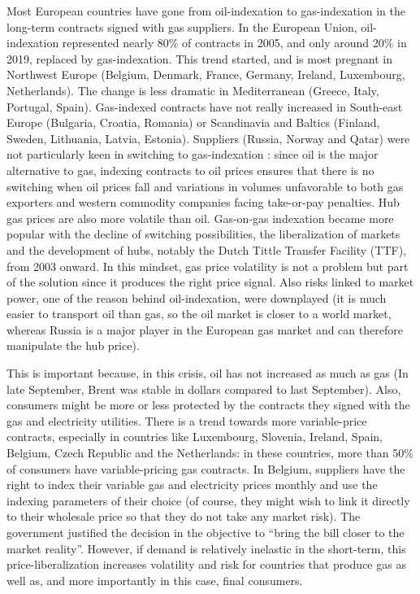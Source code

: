 \documentclass[
  9pt,
  a4paper,
  numbers=noendperiod,
  DIV=12]{scrartcl}
\begin{document}
Most European countries have gone from oil-indexation to gas-indexation
in the long-term contracts signed with gas suppliers. In the European
Union, oil-indexation represented nearly 80\% of contracts in 2005, and
only around 20\% in 2019, replaced by gas-indexation. This trend
started, and is most pregnant in Northwest Europe (Belgium, Denmark,
France, Germany, Ireland, Luxembourg, Netherlands). The change is less
dramatic in Mediterranean (Greece, Italy, Portugal, Spain). Gas-indexed
contracts have not really increased in South-east Europe (Bulgaria,
Croatia, Romania) or Scandinavia and Baltics (Finland, Sweden,
Lithuania, Latvia, Estonia). Suppliers (Russia, Norway and Qatar) were
not particularly keen in switching to gas-indexation : since oil is the
major alternative to gas, indexing contracts to oil prices ensures that
there is no switching when oil prices fall and variations in volumes
unfavorable to both gas exporters and western commodity companies facing
take-or-pay penalties. Hub gas prices are also more volatile than oil.
Gas-on-gas indexation became more popular with the decline of switching
possibilities, the liberalization of markets and the development of
hubs, notably the Dutch Tittle Transfer Facility (TTF), from 2003
onward. In this mindset, gas price volatility is not a problem but part
of the solution since it produces the right price signal. Also risks
linked to market power, one of the reason behind oil-indexation, were
downplayed (it is much easier to transport oil than gas, so the oil
market is closer to a world market, whereas Russia is a major player in
the European gas market and can therefore manipulate the hub price).

This is important because, in this crisis, oil has not increased as much
as gas (In late September, Brent was stable in dollars compared to last
September). Also, consumers might be more or less protected by the
contracts they signed with the gas and electricity utilities. There is a
trend towards more variable-price contracts, especially in countries
like Luxembourg, Slovenia, Ireland, Spain, Belgium, Czech Republic and
the Netherlands: in these countries, more than 50\% of consumers have
variable-pricing gas contracts. In Belgium, suppliers have the right to
index their variable gas and electricity prices monthly and use the
indexing parameters of their choice (of course, they might wish to link
it directly to their wholesale price so that they do not take any market
risk). The government justified the decision in the objective to ``bring
the bill closer to the market reality''. However, if demand is
relatively inelastic in the short-term, this price-liberalization
increases volatility and risk for countries that produce gas as well as,
and more importantly in this case, final consumers.
\end{document}
